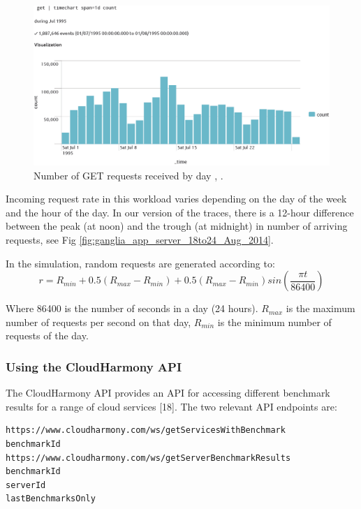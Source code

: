 \begin{figure}[!htbp]
\centering
\includegraphics[width=\textwidth,keepaspectratio]{Figures/QueueingTheory/get.png}
\caption{Number of GET requests received by day \cite{plotly_ClarkNet-HTTP_get}, \cite{ClarkNet-HTTP}.}
\label{fig:_ClarkNet-HTTP_get}
\end{figure}

Incoming request rate in this workload varies depending on the day of the
week and the hour of the day. In our version of the
traces, there is a 12-hour difference between the peak (at noon)
and the trough (at midnight) in number of arriving requests, see Fig \ref{fig:ganglia_app_server_18to24_Aug_2014}.

In the simulation, random requests are generated according to:
\begin{equation}\label{eq:web_workload}
r = R_{min} + 0.5(R_{max} - R_{min}) + 0.5(R_{max} - R_{min}) sin(\frac{\pi t}{86400}) 
\end{equation}

Where 86400 is the number of seconds in a day (24 hours). $R_{max}$ is the maximum number of requests per second on that day, $R_{min}$ is the minimum number of requests of the day.

\subsubsection{Using the CloudHarmony API}

The CloudHarmony API provides an API for accessing different benchmark results for a
range of cloud services [18]. The two relevant API endpoints are:
\begin{lstlisting}
https://www.cloudharmony.com/ws/getServicesWithBenchmark
benchmarkId
https://www.cloudharmony.com/ws/getServerBenchmarkResults
benchmarkId
serverId
lastBenchmarksOnly
\end{lstlisting}


